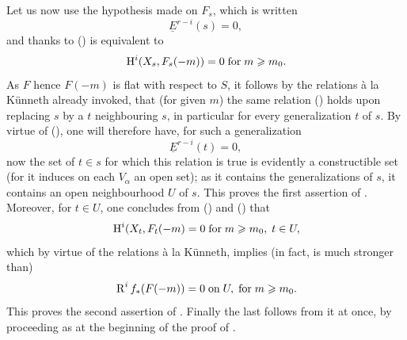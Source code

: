 Let us now use the hypothesis made on $F_s$, which is written
\steco
\begin{equation} \label{eq:XII.9} {}\underline{E}^{r-i}(s)=0,
\end{equation}
and thanks to () is equivalent to
\steco
\begin{equation} \label{eq:XII.10} {}\operatorname{H}^i(X_s, F_s(-m))=0 \; \text{for}\; m\geqslant m_0.
\end{equation}
As $F$ hence $F(-m)$ is flat with respect to $S$, it follows by
the relations \`a la Künneth already invoked, that (for given $m$) the
same relation () holds upon replacing $s$ by a
$t$ neighbouring $s$, in particular for every generalization $t$ of
$s$. By virtue of (), one will therefore have, for such a
generalization \steco
\begin{equation} \label{eq:XII.11} {}\underline{E}^{r-i}(t)=0,
\end{equation}
now the set of $t\in s$ for which this relation is true is evidently a constructible set (for it induces on each $V_\alpha$ an open set); as it contains the generalizations of $s$, it contains an open neighbourhood $U$ of $s$. This proves the first assertion of . Moreover, for $t\in U$, one concludes from () and () that
\steco
\begin{equation} \label{eq:XII.12} {}\operatorname{H}^i(X_t, F_t(-m)=0 \; \text{for}\; m\geqslant m_0, \; t\in U,
\end{equation}
which by virtue of the relations \`a la Künneth, implies (in fact, is much stronger than)
\steco
\begin{equation} \label{eq:XII.13} {}\operatorname{R}^if_\ast(F(-m))=0 \; \text{on}\; U, \; \text{for} \; m\geqslant m_0.
\end{equation}
This proves the second assertion of . Finally the last follows from it at once, by proceeding as at the beginning of the proof of .

